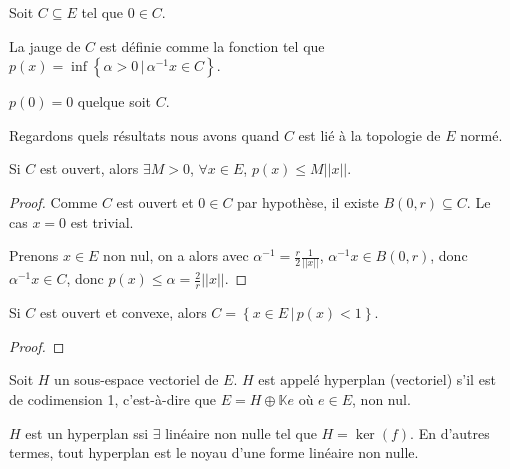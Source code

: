 \begin{definition} [Jauge]
	Soit $C \subseteq E$ tel que $0 \in C$.

	La jauge de $C$ est définie comme la fonction 
	tel que $p(x) = \inf\left\{ \alpha > 0 \, | \, \alpha^{-1}x \in C\right\}$.
\end{definition}

\begin{exercice}
	$p(0) = 0$ quelque soit $C$.
\end{exercice}

Regardons quels résultats nous avons quand $C$ est lié à la topologie de $E$
normé.

\begin{proposition}
	Si $C$ est ouvert, alors $\exists M > 0$, $\forall x \in E$, $p(x) \leq M
	||x||$.
\end{proposition}

\begin{proof}

	Comme $C$ est ouvert et $0 \in C$ par hypothèse, il existe $B(0, r)
	\subseteq C$. Le cas $x = 0$ est trivial.

	Prenons $x \in E$ non nul, on a alors avec $\alpha^{-1} = \frac{r}{2} \frac{1}{||x||}$,
	$\alpha^{-1} x \in B(0, r)$, donc $\alpha^{-1} x \in C$, donc $p(x) \leq
	\alpha = \frac{2}{r} ||x||$.
\end{proof}

\begin{proposition}
	Si $C$ est ouvert et convexe, alors $C = \left\{x \in E \, | \, p(x) <
	1\right\}$.
\end{proposition}

\begin{proof}
	
\end{proof}

\begin{definition} [Hyperplan]
	Soit $H$ un sous-espace vectoriel de $E$. $H$ est appelé hyperplan
	(vectoriel) s'il est de codimension 1, c'est-à-dire que $E = H\oplus
	\mathbb{K}e$ où $e \in E$, non nul.
\end{definition}

\begin{proposition}
	$H$ est un hyperplan ssi $\exists$ 
	linéaire non nulle tel que $H = \ker(f)$. En d'autres termes, tout hyperplan
	est le noyau d'une forme linéaire non nulle.
\end{proposition}

